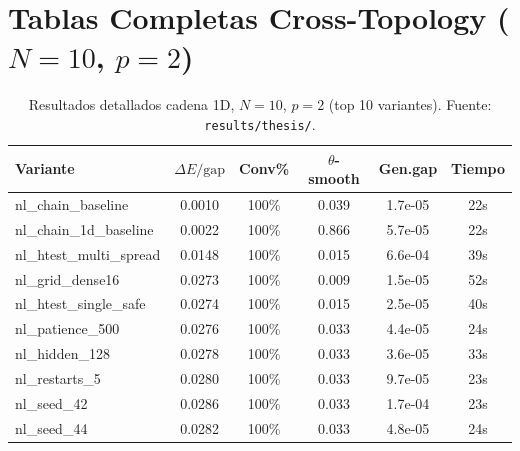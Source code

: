 \documentclass[11pt,a4paper,spanish]{book}
\begin{document}
\section{Tablas Completas Cross-Topology ($N = 10$, $p = 2$)}

\begin{table}[h]
\centering
\caption{Resultados detallados cadena 1D, $N = 10$, $p = 2$ (top 10 variantes). Fuente: \texttt{results/thesis/}.}
\label{tab:app_chain}
\begin{tabular}{lccccc}
\toprule
\textbf{Variante} & \textbf{$\Delta E/\text{gap}$} & \textbf{Conv\%} & \textbf{$\theta$-smooth} & \textbf{Gen.gap} & \textbf{Tiempo} \\
\midrule
nl\_chain\_baseline & 0.0010 & 100\% & 0.039 & 1.7e-05 & 22s \\
nl\_chain\_1d\_baseline & 0.0022 & 100\% & 0.866 & 5.7e-05 & 22s \\
nl\_htest\_multi\_spread & 0.0148 & 100\% & 0.015 & 6.6e-04 & 39s \\
nl\_grid\_dense16 & 0.0273 & 100\% & 0.009 & 1.5e-05 & 52s \\
nl\_htest\_single\_safe & 0.0274 & 100\% & 0.015 & 2.5e-05 & 40s \\
nl\_patience\_500 & 0.0276 & 100\% & 0.033 & 4.4e-05 & 24s \\
nl\_hidden\_128 & 0.0278 & 100\% & 0.033 & 3.6e-05 & 33s \\
nl\_restarts\_5 & 0.0280 & 100\% & 0.033 & 9.7e-05 & 23s \\
nl\_seed\_42 & 0.0286 & 100\% & 0.033 & 1.7e-04 & 23s \\
nl\_seed\_44 & 0.0282 & 100\% & 0.033 & 4.8e-05 & 24s \\
\bottomrule
\end{tabular}
\end{table}
\end{document}
